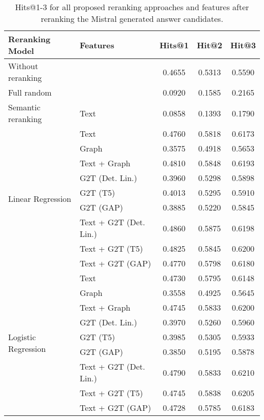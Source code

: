 \begin{table}[htbp]
    \caption{Hits@1-3 for all proposed reranking approaches and features after reranking the Mistral generated answer candidates.}
    \label{tab:controllable_fusion:mistral_all_results1}
    \centering
    \begin{tabular}{l p{6cm} c c c}
        \toprule
        \textbf{Reranking Model} & \textbf{Features} & \textbf{Hits@1} & \textbf{Hit@2} & \textbf{Hit@3} \\
        \midrule
        Without reranking & & 0.4655 & 0.5313 & 0.5590 \\
        \cmidrule(lr){1-5}
        Full random & & 0.0920 & 0.1585 & 0.2165 \\
        \cmidrule(lr){1-5}
        Semantic reranking & Text & 0.0858 & 0.1393 & 0.1790 \\
        \cmidrule(lr){1-5}
        \multirow{9}{*}{Linear Regression} & Text & 0.4760 & 0.5818 & 0.6173 \\
        & Graph & 0.3575 & 0.4918 & 0.5653 \\
        & Text + Graph & 0.4810 & 0.5848 & 0.6193 \\
        & G2T (Det. Lin.) & 0.3960 & 0.5298 & 0.5898 \\
        & G2T (T5) & 0.4013 & 0.5295 & 0.5910 \\
        & G2T (GAP) & 0.3885 & 0.5220 & 0.5845 \\
        & Text + G2T (Det. Lin.) & 0.4860 & 0.5875 & 0.6198 \\
        & Text + G2T (T5) & 0.4825 & 0.5845 & 0.6200 \\
        & Text + G2T (GAP) & 0.4770 & 0.5798 & 0.6180 \\
        \midrule
        \multirow{9}{*}{Logistic Regression} & Text & 0.4730 & 0.5795 & 0.6148 \\
        & Graph & 0.3558 & 0.4925 & 0.5645 \\
        & Text + Graph & 0.4745 & 0.5833 & 0.6200 \\
        & G2T (Det. Lin.) & 0.3970 & 0.5260 & 0.5960 \\
        & G2T (T5) & 0.3985 & 0.5305 & 0.5933 \\
        & G2T (GAP) & 0.3850 & 0.5195 & 0.5878 \\
        & Text + G2T (Det. Lin.) & 0.4790 & 0.5833 & 0.6210 \\
        & Text + G2T (T5) & 0.4745 & 0.5838 & 0.6205 \\
        & Text + G2T (GAP) & 0.4728 & 0.5785 & 0.6183 \\
        \bottomrule
    \end{tabular}
\end{table}

